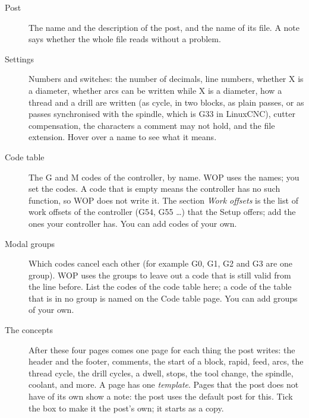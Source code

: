 \begin{description}
\item[Post] The name and the description of the post, and the name of its file. A note says whether the whole file reads without a problem.
\item[Settings] Numbers and switches: the number of decimals, line numbers, whether X is a diameter, whether arcs can be written while X is a diameter, how a thread and a drill are written (as cycle, in two blocks, as plain passes, or as passes synchronised with the spindle, which is G33 in LinuxCNC), cutter compensation, the characters a comment may not hold, and the file extension. Hover over a name to see what it means.
\item[Code table] The G and M codes of the controller, by name. WOP uses the names; you set the codes. A code that is empty means the controller has no such function, so WOP does not write it. The section \emph{Work offsets} is the list of work offsets of the controller (G54, G55 \ldots) that the Setup offers; add the ones your controller has. You can add codes of your own.
\item[Modal groups] Which codes cancel each other (for example G0, G1, G2 and G3 are one group). WOP uses the groups to leave out a code that is still valid from the line before. List the codes of the code table here; a code of the table that is in no group is named on the Code table page. You can add groups of your own.
\item[The concepts] After these four pages comes one page for each thing the post writes: the header and the footer, comments, the start of a block, rapid, feed, arcs, the thread cycle, the drill cycles, a dwell, stops, the tool change, the spindle, coolant, and more. A page has one \emph{template}. Pages that the post does not have of its own show a note: the post uses the default post for this. Tick the box to make it the post's own; it starts as a copy.
\end{description}

